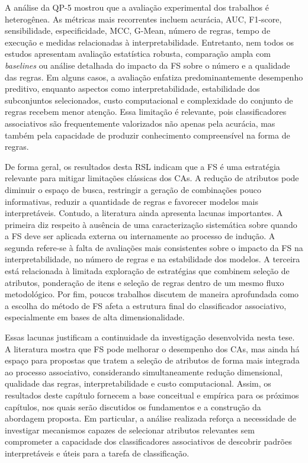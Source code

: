 A análise da QP-5 mostrou que a avaliação experimental dos trabalhos é heterogênea. As métricas mais recorrentes incluem acurácia, AUC, F1-score, sensibilidade, especificidade, MCC, G-Mean, número de regras, tempo de execução e medidas relacionadas à interpretabilidade. Entretanto, nem todos os estudos apresentam avaliação estatística robusta, comparação ampla com \textit{baselines} ou análise detalhada do impacto da FS sobre o número e a qualidade das regras. Em alguns casos, a avaliação enfatiza predominantemente desempenho preditivo, enquanto aspectos como interpretabilidade, estabilidade dos subconjuntos selecionados, custo computacional e complexidade do conjunto de regras recebem menor atenção. Essa limitação é relevante, pois classificadores associativos são frequentemente valorizados não apenas pela acurácia, mas também pela capacidade de produzir conhecimento compreensível na forma de regras.

De forma geral, os resultados desta RSL indicam que a FS é uma estratégia relevante para mitigar limitações clássicas dos CAs. A redução de atributos pode diminuir o espaço de busca, restringir a geração de combinações pouco informativas, reduzir a quantidade de regras e favorecer modelos mais interpretáveis. Contudo, a literatura ainda apresenta lacunas importantes. A primeira diz respeito à ausência de uma caracterização sistemática sobre quando a FS deve ser aplicada externa ou internamente ao processo de indução. A segunda refere-se à falta de avaliações mais consistentes sobre o impacto da FS na interpretabilidade, no número de regras e na estabilidade dos modelos. A terceira está relacionada à limitada exploração de estratégias que combinem seleção de atributos, ponderação de itens e seleção de regras dentro de um mesmo fluxo metodológico. Por fim, poucos trabalhos discutem de maneira aprofundada como a escolha do método de FS afeta a estrutura final do classificador associativo, especialmente em bases de alta dimensionalidade.

Essas lacunas justificam a continuidade da investigação desenvolvida nesta tese. A literatura mostra que FS pode melhorar o desempenho dos CAs, mas ainda há espaço para propostas que tratem a seleção de atributos de forma mais integrada ao processo associativo, considerando simultaneamente redução dimensional, qualidade das regras, interpretabilidade e custo computacional. Assim, os resultados deste capítulo fornecem a base conceitual e empírica para os próximos capítulos, nos quais serão discutidos os fundamentos e a construção da abordagem proposta. Em particular, a análise realizada reforça a necessidade de investigar mecanismos capazes de selecionar atributos relevantes sem comprometer a capacidade dos classificadores associativos de descobrir padrões interpretáveis e úteis para a tarefa de classificação.
